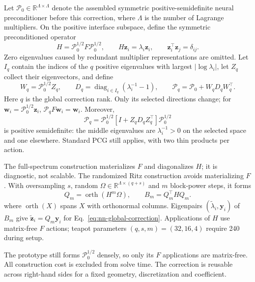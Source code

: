 \documentclass{article}
\newcommand{\vect}[1]{\boldsymbol{#1}}
\newcommand{\R}{\mathbb{R}}
\newcommand{\Fschur}{F}                           %
\theoremstyle{plain}
\numberwithin{equation}{section}
\begin{document}
Let $\mathcal P_0\in\R^{\Lambda\times\Lambda}$ denote the assembled symmetric
positive-semidefinite neural preconditioner before this correction, where
$\Lambda$ is the number of Lagrange multipliers.  On the positive interface
subspace, define the symmetric preconditioned operator
\begin{equation}
    H=\mathcal P_0^{1/2}\Fschur\mathcal P_0^{1/2},
    \qquad H\vect z_i=\lambda_i\vect z_i,
    \qquad \vect z_i^\top\vect z_j=\delta_{ij}.
    \label{eq:nn-global-spectrum}
\end{equation}
Zero eigenvalues caused by redundant multiplier representations are omitted.
Let $I_q$ contain the indices of the $q$ positive eigenvalues with largest
$|\log\lambda_i|$, let $Z_q$ collect their eigenvectors, and define
\begin{equation}
    W_q=\mathcal P_0^{1/2}Z_q,
    \qquad
    D_q=\operatorname{diag}_{i\in I_q}(\lambda_i^{-1}-1),
    \qquad
    \mathcal P_q=\mathcal P_0+W_qD_qW_q^\top.
    \label{eq:nn-global-correction}
\end{equation}
Here $q$ is the global correction rank.  Only its selected directions change;
for $\vect w_i=\mathcal P_0^{1/2}\vect z_i$,
$\mathcal P_q\Fschur\vect w_i=\vect w_i$.  Moreover,
\begin{equation}
    \mathcal P_q=\mathcal P_0^{1/2}
    \left[I+Z_qD_qZ_q^\top\right]\mathcal P_0^{1/2}
    \label{eq:nn-global-correction-spd}
\end{equation}
is positive semidefinite: the middle eigenvalues are $\lambda_i^{-1}>0$ on
the selected space and one elsewhere.  Standard PCG still applies, with two
thin products per action.

The full-spectrum construction materializes $\Fschur$ and diagonalizes $H$;
it is diagnostic, not scalable.  The randomized Ritz construction avoids
materializing $\Fschur$.  With oversampling $s$, random
$\Omega\in\R^{\Lambda\times(q+s)}$ and $m$ block-power steps, it forms
\begin{equation}
    Q_m=\operatorname{orth}(H^m\Omega),\qquad
    B_m=Q_m^\top H Q_m.
    \label{eq:nn-randomized-ritz}
\end{equation}
where $\operatorname{orth}(X)$ spans $X$ with orthonormal columns.  Eigenpairs
$(\widetilde\lambda_i,\vect y_i)$ of $B_m$ give
$\widetilde{\vect z}_i=Q_m\vect y_i$ for Eq.~\eqref{eq:nn-global-correction}.
Applications of $H$ use matrix-free $\Fschur$ actions; teapot parameters
$(q,s,m)=(32,16,4)$ require 240 during setup.

The prototype still forms $\mathcal P_0^{1/2}$ densely, so only its
$\Fschur$ applications are matrix-free.  All construction cost is excluded
from solve time.  The correction is reusable across right-hand sides for a
fixed geometry, discretization and coefficient.
\end{document}
